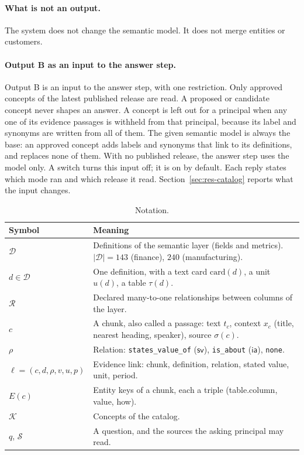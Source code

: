 \documentclass[11pt,a4paper]{article}
\newcommand{\sv}{\mathsf{sv}}
\newcommand{\ia}{\mathsf{ia}}
\begin{document}
\paragraph{What is not an output.} The system does not change the semantic model. It does not merge entities or customers.

\paragraph{Output B as an input to the answer step.} Output B is an input to the answer step, with one restriction. Only approved concepts of the latest published release are read. A proposed or candidate concept never shapes an answer. A concept is left out for a principal when any one of its evidence passages is withheld from that principal, because its label and synonyms are written from all of them. The given semantic model is always the base: an approved concept adds labels and synonyms that link to its definitions, and replaces none of them. With no published release, the answer step uses the model only. A switch turns this input off; it is on by default. Each reply states which mode ran and which release it read. Section~\ref{sec:res-catalog} reports what the input changes. %

\begin{table}[H]
\centering\small
\caption{Notation.}
\label{tab:notation}
\begin{tabular}{lp{11cm}}
\toprule
Symbol & Meaning\\\midrule
$\mathcal{D}$ & Definitions of the semantic layer (fields and metrics). $|\mathcal{D}| = 143$ (finance), $240$ (manufacturing).\\
$d \in \mathcal{D}$ & One definition, with a text card $\mathrm{card}(d)$, a unit $u(d)$, a table $\tau(d)$.\\
$\mathcal{R}$ & Declared many-to-one relationships between columns of the layer.\\
$c$ & A chunk, also called a passage: text $t_c$, context $x_c$ (title, nearest heading, speaker), source $\sigma(c)$.\\
$\rho$ & Relation: \texttt{states\_value\_of} ($\sv$), \texttt{is\_about} ($\ia$), \texttt{none}.\\
$\ell = (c, d, \rho, v, u, p)$ & Evidence link: chunk, definition, relation, stated value, unit, period.\\
$E(c)$ & Entity keys of a chunk, each a triple (table.column, value, how).\\
$\mathcal{K}$ & Concepts of the catalog.\\
$q$, $\mathcal{S}$ & A question, and the sources the asking principal may read.\\
\bottomrule
\end{tabular}
\end{table}
\end{document}
